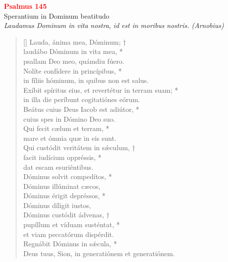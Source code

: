 


\def\greinitialformat#1{%
{\fontsize{39}{39}\selectfont #1}%
}




\vspace{0.3cm}
\begin{center}
 \textcolor{red}{\large \bf Psalmus 145}\\
Sperantium in Dominum beatitudo\\
\textit{\small Laudamus Dominum in vita nostra, id est in moribus nostris. (Arnobius)}
\end{center}
\begin{verse}[\versewidth]
Lauda, ánima mea, Dóminum; †\\
laudábo Dóminum in vita mea, *\\
psallam Deo meo, quámdiu fúero.\\
\vin Nolíte confídere in princípibus, *\\
\vin in fíliis hóminum, in quibus non est salus.\\
Exíbit spíritus eius, et revertétur in terram suam; *\\
in illa die períbunt cogitatiónes eórum.\\
\vin Beátus cuius Deus Iacob est adiútor, *\\
\vin cuius spes in Dómino Deo suo.\\
Qui fecit cælum et terram, *\\
mare et ómnia quæ in eis sunt.\\
\vin Qui custódit veritátem in s\'{æ}culum, †\\
\vin facit iudícium oppréssis, *\\
\vin dat escam esuriéntibus.\\
Dóminus solvit compedítos, *\\
Dóminus illúminat cæcos,\\
\vin Dóminus érigit depréssos, *\\
\vin Dóminus díligit iustos,\\
Dóminus custódit ádvenas, †\\
pupíllum et víduam susténtat, *\\
et viam peccatórum dispérdit.\\
\vin Regnábit Dóminus in s\'{æ}cula, *\\
\vin Deus tuus, Sion, in generatiónem et generatiónem.\\
\end{verse}
\vspace{1cm}


